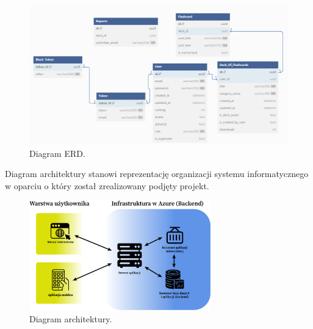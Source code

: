 \begin{figure}[H]
    \centering
    \includegraphics[width=1\textwidth]{chapters/chapter_6/erd}
    \caption{Diagram ERD.}
    \label{img:erd}
\end{figure}

\indent Diagram architektury stanowi reprezentację organizacji systemu informatycznego w oparciu o który został zrealizowany podjęty projekt.


\begin{figure}[H]
    \centering
    \includegraphics[width=0.7\textwidth]{chapters/chapter_6/diagram_architektury}
    \caption{Diagram architektury.}
    \label{img:diagram_architektury}
\end{figure}


\setlength{\parindent}{15pt}
\newpage

